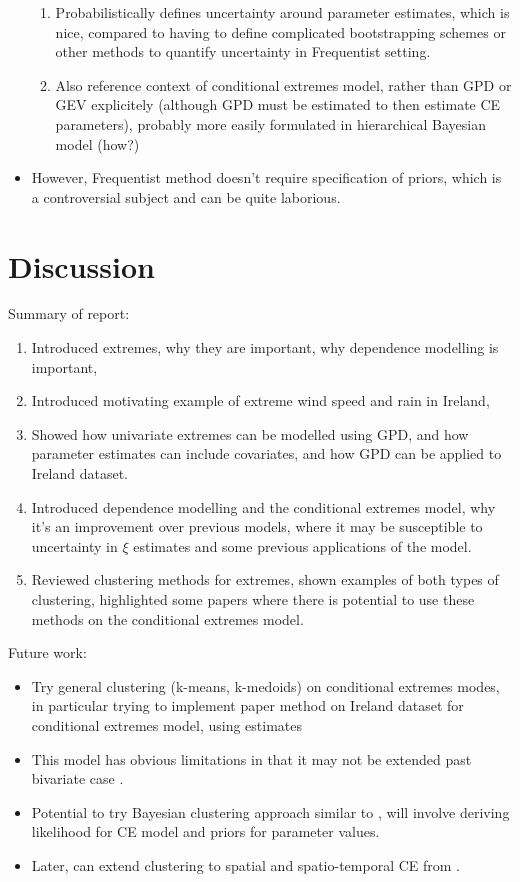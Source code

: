\documentclass{article}
\numberwithin{equation}{section}
\begin{document}
\begin{itemize}
\begin{enumerate}
      \item Probabilistically defines uncertainty around parameter estimates, which is nice, compared to having to define complicated bootstrapping schemes or other methods to quantify uncertainty in Frequentist setting. 
      \item Also reference context of conditional extremes model, rather than GPD or GEV explicitely (although GPD must be estimated to then estimate CE parameters), probably more easily formulated in hierarchical Bayesian model (how?)
    \end{enumerate}
  \item However, Frequentist method doesn't require specification of priors, which is a controversial subject and can be quite laborious.  
\end{itemize}

\section{Discussion} \label{sec:discussion}

Summary of report:
\begin{enumerate}
  \item Introduced extremes, why they are important, why dependence modelling is important,
  \item Introduced motivating example of extreme wind speed and rain in Ireland,
  \item Showed how univariate extremes can be modelled using GPD, and how parameter estimates can include covariates, and how GPD can be applied to Ireland dataset. 
  \item Introduced dependence modelling and the conditional extremes model, why it's an improvement over previous models, where it may be susceptible to uncertainty in $\xi$ estimates and some previous applications of the model.
  \item Reviewed clustering methods for extremes, shown examples of both types of clustering, highlighted some papers where there is potential to use these methods on the conditional extremes model.
\end{enumerate}

Future work:
\begin{itemize}
  \item Try general clustering (k-means, k-medoids) on conditional extremes modes, in particular trying to implement \cite{Vignotto2021} paper method on Ireland dataset for conditional extremes model, using estimates 
  \item This model has obvious limitations in that it may not be extended past bivariate case .
  \item Potential to try Bayesian clustering approach similar to \cite{Rohrbeck2021}, will involve deriving likelihood for CE model and priors for parameter values. 
  \item Later, can extend clustering to spatial and spatio-temporal CE from \cite{Tawn2018}.
\end{itemize}
\end{document}
